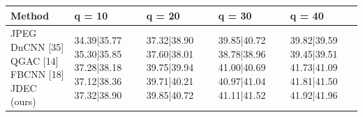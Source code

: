 \begin{tabular}{lllll}
\toprule
Method & q = 10 & q = 20 & q = 30 & q = 40 \\
\midrule
JPEG DnCNN [35] QGAC [14] FBCNN [18] JDEC (ours) & 34.39|35.77 35.30|35.85 37.28|38.18 37.12|38.36 37.32|38.90 & 37.32|38.90 37.60|38.01 39.75|39.94 39.71|40.21 39.85|40.72 & 39.85|40.72 38.78|38.96 41.00|40.69 40.97|41.04 41.11|41.52 & 39.82|39.59 39.45|39.51 41.73|41.09 41.81|41.50 41.92|41.96 \\
\bottomrule
\end{tabular}
